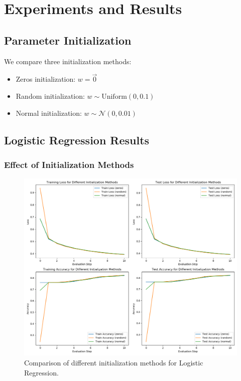 \documentclass[journal, a4paper]{IEEEtran}
\begin{document}
\section{Experiments and Results}

\subsection{Parameter Initialization}
We compare three initialization methods:
\begin{itemize}
    \item Zeros initialization: $w = \vec{0}$
    \item Random initialization: $w \sim \text{Uniform}(0, 0.1)$
    \item Normal initialization: $w \sim \mathcal{N}(0, 0.01)$
\end{itemize}

\subsection{Logistic Regression Results}

\subsubsection{Effect of Initialization Methods}
\begin{figure}[htbp]
\centering
\includegraphics[width=\linewidth]{logistic_regression_init_methods.png}
\caption{Comparison of different initialization methods for Logistic Regression.}
\label{fig:lr_init}
\end{figure}
\end{document}
